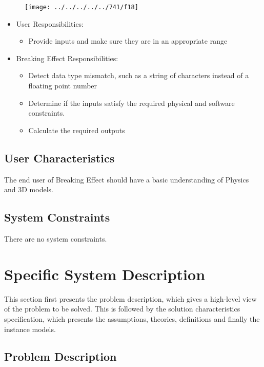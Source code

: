 \documentclass[12pt]{article}
\newcommand{\progname}{Breaking Effect} %
\begin{document}
\begin{figure}
	\centering
	\texttt{[image: ../../../../../741/f18]}
	\caption{}
	\label{fig:f18}
\end{figure}

\begin{itemize}
\item User Responsibilities:
\begin{itemize}
\item Provide inputs and make sure they are in an appropriate range
\end{itemize}
\item \progname{} Responsibilities:
\begin{itemize}
\item Detect data type mismatch, such as a string of characters instead of a
  floating point number
\item Determine if the inputs satisfy the required physical and software constraints.​
\item Calculate the required outputs
\end{itemize}
\end{itemize}

\subsection{User Characteristics} \label{SecUserCharacteristics}

The end user of \progname{} should have a basic understanding of Physics and 3D models.

\subsection{System Constraints}

There are no system constraints.

\section{Specific System Description}

This section first presents the problem description, which gives a high-level
view of the problem to be solved.  This is followed by the solution characteristics
specification, which presents the assumptions, theories, definitions and finally
the instance models. 

\subsection{Problem Description} \label{Sec_pd}
\end{document}
